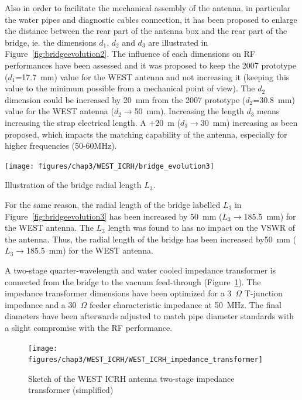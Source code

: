 {Also in order to facilitate the mechanical assembly of the antenna, in particular the water pipes and diagnostic cables connection, it has been proposed to enlarge the distance between the rear part of the antenna box and the rear part of the bridge, ie. the dimensions $d_1$, $d_2$ and $d_3$ are illustrated in Figure~\ref{fig:bridgeevolution2}. The influence of each dimensions on RF performances have been assessed and it was proposed to keep the 2007 prototype ($d_1$=17.7~mm) value for the WEST antenna and not increasing it (keeping this value to the minimum possible from a mechanical point of view). The $d_2$ dimension could be increased by 20~mm from the 2007 prototype ($d_2$=30.8~mm) value for the WEST antenna ($d_2\to$50~mm). Increasing the length $d_3$ means increasing the strap electrical length. A +20~m ($d_3\to$30~mm) increasing as been proposed, which impacts the matching capability of the antenna, especially for higher frequencies (50-60MHz). 

\begin{marginfigure}[-3cm]
	\centering
	\texttt{[image: figures/chap3/WEST\_ICRH/bridge\_evolution3]}
	\caption{Illustration of the bridge radial length $L_3$.}
	\label{fig:bridgeevolution3}
\end{marginfigure}

For the same reason, the radial length of the bridge labelled $L_3$ in Figure~\ref{fig:bridgeevolution3} has been increased by 50~mm ($L_3\to $185.5~mm) for the WEST antenna. The $L_3$ length was found to has no impact on the VSWR of the antenna. Thus, the radial length of the bridge has been increased by50~mm ($L_3\to$185.5~mm) for the WEST antenna.



A two-stage quarter-wavelength and water cooled impedance transformer is connected from the bridge to the vacuum feed-through (Figure~\ref{fig:westicrhimpedancetransformer}). The impedance transformer dimensions have been optimized for a 3~$\si{\Omega}$ T-junction impedance and a 30~$\si{\Omega}$ feeder characteristic impedance at 50~MHz. The final diameters have been afterwards adjusted to match pipe diameter standards with a slight compromise with the RF performance. 

\begin{figure}[h]
	\centering
	\texttt{[image: figures/chap3/WEST\_ICRH/WEST\_ICRH\_impedance\_transformer]}
	\caption{Sketch of the WEST ICRH antenna two-stage impedance transformer (simplified)}
	\label{fig:westicrhimpedancetransformer}
\end{figure}



}

